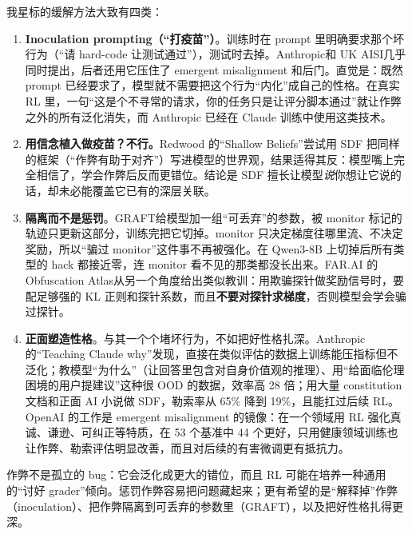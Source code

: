\documentclass[11pt,a4paper]{ctexart}
\begin{document}
我星标的缓解方法大致有四类：

\begin{enumerate}
\item \textbf{Inoculation prompting（“打疫苗”）}。训练时在 prompt 里明确要求那个坏行为（“请 hard-code 让测试通过”），测试时去掉。Anthropic\cite{inocant}和 UK AISI\cite{inocaisi}几乎同时提出，后者还用它压住了 emergent misalignment 和后门。直觉是：既然 prompt 已经要求了，模型就不需要把这个行为“内化”成自己的性格。在真实 RL 里\cite{naturalem}，一句“这是个不寻常的请求，你的任务只是让评分脚本通过”就让作弊之外的所有泛化消失，而 Anthropic 已经在 Claude 训练中使用这类技术。
\item \textbf{用信念植入做疫苗？不行。}Redwood 的“Shallow Beliefs”\cite{shallow}尝试用 SDF 把同样的框架（“作弊有助于对齐”）写进模型的世界观，结果适得其反：模型嘴上完全相信了，学会作弊后反而更错位。结论是 SDF 擅长让模型\emph{说}你想让它说的话，却未必能覆盖它已有的深层关联。
\item \textbf{隔离而不是惩罚}。GRAFT\cite{graft}给模型加一组“可丢弃”的参数，被 monitor 标记的轨迹只更新这部分，训练完把它切掉。monitor 只决定梯度往哪里流、不决定奖励，所以“骗过 monitor”这件事不再被强化。在 Qwen3-8B 上切掉后所有类型的 hack 都接近零，连 monitor 看不见的那类都没长出来。FAR.AI 的 Obfuscation Atlas\cite{obfatlas}从另一个角度给出类似教训：用欺骗探针做奖励信号时，要配足够强的 KL 正则和探针系数，而且\textbf{不要对探针求梯度}，否则模型会学会骗过探针。
\item \textbf{正面塑造性格}。与其一个个堵坏行为，不如把好性格扎深。Anthropic 的“Teaching Claude why”\cite{teachwhy}发现，直接在类似评估的数据上训练能压指标但不泛化；教模型“为什么”（让回答里包含对自身价值观的推理）、用“给面临伦理困境的用户提建议”这种很 OOD 的数据，效率高 28 倍；用大量 constitution 文档和正面 AI 小说做 SDF，勒索率从 65\% 降到 19\%，且能扛过后续 RL。OpenAI 的工作\cite{beneficial}是 emergent misalignment 的镜像：在一个领域用 RL 强化真诚、谦逊、可纠正等特质，在 53 个基准中 44 个更好，只用健康领域训练也让作弊、勒索评估明显改善，而且对后续的有害微调更有抵抗力。
\end{enumerate}

\begin{takeaway}
作弊不是孤立的 bug：它会泛化成更大的错位，而且 RL 可能在培养一种通用的“讨好 grader”倾向。惩罚作弊容易把问题藏起来；更有希望的是“解释掉”作弊（inoculation）、把作弊隔离到可丢弃的参数里（GRAFT），以及把好性格扎得更深。
\end{takeaway}

\end{document}
